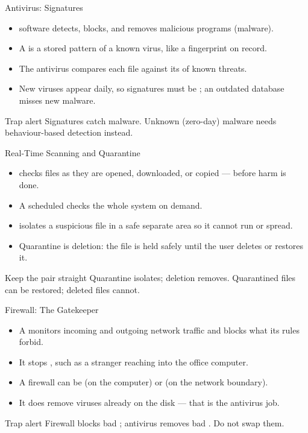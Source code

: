 \documentclass[aspectratio=169]{beamer}
\begin{document}
\begin{frame}{Antivirus: Signatures}
  \begin{itemize}
    \item {} software detects, blocks, and removes malicious
      programs (malware).
    \item A  is a stored pattern of a known virus, like a
      fingerprint on record.
    \item The antivirus compares each file against its  of known threats.
    \item New viruses appear daily, so signatures must be ; an outdated database misses new malware.
  \end{itemize}
  \begin{alertblock}{Trap alert}
    Signatures catch  malware. Unknown (zero-day) malware needs
    behaviour-based detection instead.
  \end{alertblock}
\end{frame}

\begin{frame}{Real-Time Scanning and Quarantine}
  \begin{itemize}
    \item {} checks files as they are opened,
      downloaded, or copied --- before harm is done.
    \item A scheduled  checks the whole system on demand.
    \item {} isolates a suspicious file in a safe separate
      area so it cannot run or spread.
    \item Quarantine is  deletion: the file is held safely until the
      user deletes or restores it.
  \end{itemize}
  \begin{block}{Keep the pair straight}
    Quarantine isolates; deletion removes. Quarantined files can be restored;
    deleted files cannot.
  \end{block}
\end{frame}

\begin{frame}{Firewall: The Gatekeeper}
  \begin{itemize}
    \item A  monitors incoming and outgoing network traffic and
      blocks what its rules forbid.
    \item It stops , such as a stranger
      reaching into the office computer.
    \item A firewall can be  (on the computer) or
       (on the network boundary).
    \item It does  remove viruses already on the disk --- that is the
      antivirus job.
  \end{itemize}
  \begin{alertblock}{Trap alert}
    Firewall blocks bad ; antivirus removes bad . Do
    not swap them.
  \end{alertblock}
\end{frame}
\end{document}
